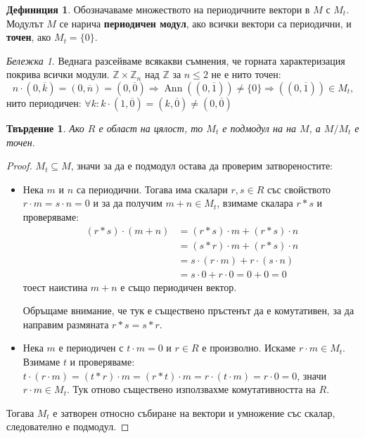 \documentclass{article}
\newif\ifusemulticols
\newcommand\newterm[1]{\textbf{#1}}
\theoremstyle{definition}
\newtheorem{deff}{Дефиниция}
\theoremstyle{remark}
\newtheorem*{note}{Бележка}
\theoremstyle{plain}
\theoremstyle{plain}
\newtheorem{prop}[theorem]{Твърдение}
\newenvironment{mymulticols}
    { \ifusemulticols \begin{multicols}{2} \fi }
    { \ifusemulticols \end{multicols} \fi }
\DeclareMathOperator{\Ann}{Ann}
\newcommand{\Z}{\mathbb{Z}}
\begin{document}
\begin{mymulticols}
\begin{deff}
    Обозначаваме множеството на периодичните вектори в $M$ с $M_t$.
    Модулът $M$ се нарича \newterm{периодичен модул}, ако всички вектори са периодични, и
    \newterm{точен}, ако $M_t = \{0\}$.
\end{deff}

\begin{note}
    Веднага разсейваме всякакви съмнения, че горната характеризация покрива всички модули.
%
    $\Z \times \Z_n$ над $\Z$ за $n \le 2$ не е нито точен: $$n \cdot (0, \overline k) = (0,
    \overline n) = (0, \overline 0) \Rightarrow \Ann \left((0, \overline 1)\right) \neq \{ 0 \}
    \Rightarrow \left((0,\overline 1)\right)\in M_t,$$ нито периодичен: $\forall k: k \cdot (1,
    \overline 0) = (k, \overline 0) \neq (0, \overline 0)$

\end{note}

\begin{prop}
    \label{torsion-prop}
    Ако $R$ е област на цялост, то $M_t$ е подмодул на на $M$, а $M / M_t$ е точен.
\end{prop}
\begin{proof}
    $M_t \subseteq M$, значи за да е подмодул остава да проверим затвореностите:
    \begin{itemize}
        \item Нека $m$ и $n$ са периодични. Тогава има скалари $r, s \in R$ със свойството $r\cdot m
            = s\cdot n = 0$ и за да получим $m+n \in M_t$, взимаме скалара $r*s$ и проверяваме:
            \begin{align*}
                (r*s)\cdot(m+n) &= (r*s)\cdot m + (r*s)\cdot n \\
                                &= (s*r)\cdot m + (r*s)\cdot n \\
                                &= s\cdot(r \cdot m) + r \cdot (s\cdot n)\\
                                &= s\cdot 0 + r\cdot 0 = 0 + 0 = 0
            \end{align*}
            тоест наистина $m + n$ е също периодичен вектор.

            Обръщаме внимание, че тук е съществено пръстенът да е комутативен, за да направим
            размяната $r*s = s*r$.
        \item Нека $m$ е периодичен с $t \cdot m = 0$ и $r \in R$ е произволно.
            Искаме $r\cdot m \in M_t$.
            Взимаме $t$ и проверяваме: $t \cdot (r \cdot m) = (t*r) \cdot m = (r*t) \cdot m = r
            \cdot (t \cdot m) = r \cdot 0 = 0$, значи $r \cdot m \in M_t$. Тук отново съществено
            използвахме комутативността на $R$.
    \end{itemize}
    Тогава $M_t$ е затворен относно събиране на вектори и умножение със скалар, следователно е подмодул.


\end{proof}
\end{mymulticols}
\end{document}
